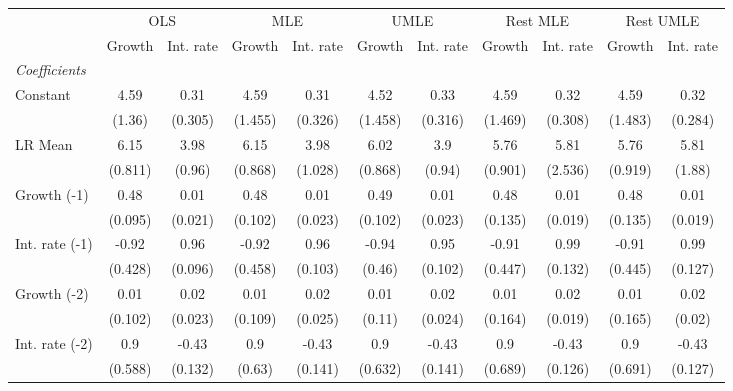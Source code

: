 \begin{table}[htbp] 
	\centering
	\begin{tabular}{@{\extracolsep{4pt}}lcccccccccc@{}}		\hline\hline
		 		 & \multicolumn{2}{c}{OLS} &\multicolumn{2}{c}{MLE} &\multicolumn{2}{c}{UMLE} &\multicolumn{2}{c}{Rest MLE} &\multicolumn{2}{c}{Rest UMLE} \\ 
 		 & Growth 	 & Int. rate 	 & Growth 	 & Int. rate 	 & Growth 	 & Int. rate 	 & Growth 	 & Int. rate 	 & Growth 	 & Int. rate\\\cline{2-3}\cline{4-5}\cline{6-7}\cline{8-9}\cline{10-11}
\rule{0pt}{4ex} 
 \emph{Coefficients} 	  		 & 		 & 		 & 		 & 		 & 		 & 		 & 		 & 		 & 		 &\\ 
\quad Constant 	 & 4.59 	 & 0.31 	 & 4.59 	 & 0.31 	 & 4.52 	 & 0.33 	 & 4.59 	 & 0.32 	 & 4.59 	 & 0.32	 \\ 
 		 & (1.36) 	 & (0.305) 	 & (1.455) 	 & (0.326) 	 & (1.458) 	 & (0.316) 	 & (1.469) 	 & (0.308) 	 & (1.483) 	 & (0.284) 	 \\ 
\quad LR Mean 	 & 6.15 	 & 3.98 	 & 6.15 	 & 3.98 	 & 6.02 	 & 3.9 	 & 5.76 	 & 5.81 	 & 5.76 	 & 5.81	 \\ 
 		 & (0.811) 	 & (0.96) 	 & (0.868) 	 & (1.028) 	 & (0.868) 	 & (0.94) 	 & (0.901) 	 & (2.536) 	 & (0.919) 	 & (1.88) 	 \\ 
\quad Growth (-1) 	 &0.48 	 & 0.01 	 & 0.48 	 & 0.01 	 & 0.49 	 & 0.01 	 & 0.48 	 & 0.01 	 & 0.48 	 & 0.01	 \\ 
 		 & (0.095) 	 & (0.021) 	 & (0.102) 	 & (0.023) 	 & (0.102) 	 & (0.023) 	 & (0.135) 	 & (0.019) 	 & (0.135) 	 & (0.019) 	 \\ 
\quad Int. rate (-1) 	 &-0.92 	 & 0.96 	 & -0.92 	 & 0.96 	 & -0.94 	 & 0.95 	 & -0.91 	 & 0.99 	 & -0.91 	 & 0.99	 \\ 
 		 & (0.428) 	 & (0.096) 	 & (0.458) 	 & (0.103) 	 & (0.46) 	 & (0.102) 	 & (0.447) 	 & (0.132) 	 & (0.445) 	 & (0.127) 	 \\ 
\quad Growth (-2) 	 &0.01 	 & 0.02 	 & 0.01 	 & 0.02 	 & 0.01 	 & 0.02 	 & 0.01 	 & 0.02 	 & 0.01 	 & 0.02	 \\ 
 		 & (0.102) 	 & (0.023) 	 & (0.109) 	 & (0.025) 	 & (0.11) 	 & (0.024) 	 & (0.164) 	 & (0.019) 	 & (0.165) 	 & (0.02) 	 \\ 
\quad Int. rate (-2) 	 &0.9 	 & -0.43 	 & 0.9 	 & -0.43 	 & 0.9 	 & -0.43 	 & 0.9 	 & -0.43 	 & 0.9 	 & -0.43	 \\ 
 		 & (0.588) 	 & (0.132) 	 & (0.63) 	 & (0.141) 	 & (0.632) 	 & (0.141) 	 & (0.689) 	 & (0.126) 	 & (0.691) 	 & (0.127) 	 \\ 

\end{tabular}
\end{table}
